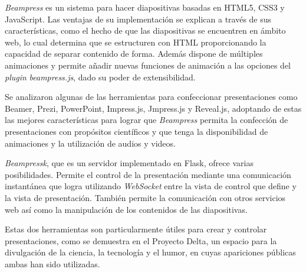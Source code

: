 \begin{conclusions}

	\textit{Beampress} es un sistema para hacer diapositivas basadas en HTML5, CSS3 y JavaScript. Las ventajas de su implementación se explican a través de sus características, como el hecho de que las diapositivas se encuentren en ámbito web, lo cual determina que se estructuren con HTML proporcionando la capacidad de separar contenido de forma. Además dispone de múltiples animaciones y permite añadir nuevas funciones de animación a las opciones del \textit{plugin} \textit{beampress.js}, dado su poder de extensibilidad.

	Se analizaron algunas de las herramientas para confeccionar presentaciones como Beamer, Prezi, PowerPoint, Impress.js, Jmpress.js y Reveal.js, adoptando de estas las mejores características para lograr que \textit{Beampress} permita la confección de presentaciones con propósitos científicos y que tenga la disponibilidad de animaciones y la utilización de audios y videos.

	\textit{Beampressk}, que es un servidor implementado en Flask, ofrece varias posibilidades. Permite el control de la presentación mediante una comunicación instantánea que logra utilizando \textit{WebSocket} entre la vista de control que define y la vista de presentación. También permite la comunicación con otros servicios web así como la manipulación de los contenidos de las diapositivas.

	Estas dos herramientas son particularmente útiles para crear y controlar presentaciones, como se demuestra en el Proyecto Delta, un espacio para la divulgación de la ciencia, la tecnología y el humor, en cuyas apariciones públicas ambas han sido utilizadas. 

\end{conclusions}
